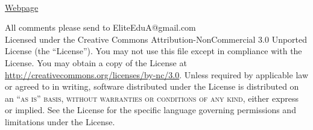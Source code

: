 \documentclass[11pt,fleqn]{book} %
\begin{document}


%
%
%




\begingroup
\thispagestyle{empty}

\vfill

\endgroup

% 
\newpage
~\vfill
\thispagestyle{empty}


\noindent \href{https://sites.google.com/view/eliteedua}{Webpage}

\noindent All comments please send to EliteEduA@gmail.com\\ %

\noindent Licensed under the Creative Commons Attribution-NonCommercial 3.0 Unported License (the ``License''). You may not use this file except in compliance with the License. You may obtain a copy of the License at \url{http://creativecommons.org/licenses/by-nc/3.0}. Unless required by applicable law or agreed to in writing, software distributed under the License is distributed on an \textsc{``as is'' basis, without warranties or conditions of any kind}, either express or implied. See the License for the specific language governing permissions and limitations under the License.\\ %
\end{document}

